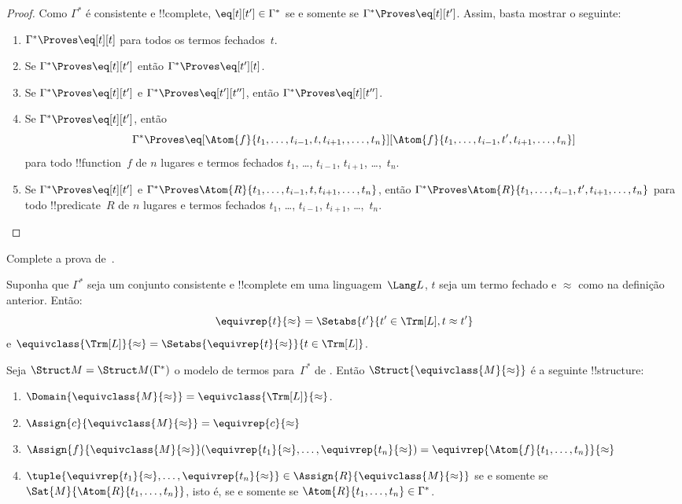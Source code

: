 \documentclass[../../../include/open-logic-section]{subfiles}
\begin{document}
\begin{proof}
Como $\Gamma^*$ é consistente e !!{complete}, $\eq[t][t'] \in
\Gamma^*$ se e somente se $\Gamma^* \Proves \eq[t][t']$.  Assim, basta
mostrar o seguinte:
\begin{enumerate}
\item $\Gamma^* \Proves \eq[t][t]$ para todos os termos fechados~$t$.
\item Se $\Gamma^* \Proves \eq[t][t']$ então $\Gamma^* \Proves \eq[t'][t]$.
\item Se $\Gamma^* \Proves \eq[t][t']$ e $\Gamma^* \Proves
  \eq[t'][t'']$, então $\Gamma^* \Proves \eq[t][t'']$.
\item Se $\Gamma^* \Proves \eq[t][t']$, então
\[
\Gamma^* \Proves
\eq[\Atom{f}{t_1,\dots,t_{i-1},t,t_{i+1},,\dots,t_n}][\Atom{f}{t_1,\dots,t_{i-1},t',t_{i+1},\dots,t_n}]
\]
para todo !!{function}~$f$ de $n$ lugares e termos fechados $t_1$, \dots,
$t_{i-1}$, $t_{i+1}$, \dots,~$t_n$.
\item Se $\Gamma^* \Proves \eq[t][t']$ e
$\Gamma^* \Proves
\Atom{R}{t_1,\dots,t_{i-1},t,t_{i+1},\dots,t_n}$, então
$\Gamma^* \Proves \Atom{R}{t_1,\dots,t_{i-1},t',t_{i+1},\dots,t_n}$
para todo !!{predicate}~$R$ de $n$ lugares e termos fechados $t_1$, \dots,
$t_{i-1}$, $t_{i+1}$, \dots,~$t_n$.
\end{enumerate}
\end{proof}

\begin{prob}
Complete a prova de~.
\end{prob}

\begin{defn}
Suponha que $\Gamma^*$ seja um conjunto consistente e !!{complete} em uma
linguagem~$\Lang L$, $t$ seja um termo fechado e $\approx$ como na
definição anterior. Então:
\[
\equivrep{t}{\approx} = \Setabs{t'}{t'\in \Trm[L], t \approx t'}
\]
e $\equivclass{\Trm[L]}{\approx} = \Setabs{\equivrep{t}{\approx}}{t \in \Trm[L]}$.
\end{defn}

\begin{defn}
Seja $\Struct M = \Struct M(\Gamma^*)$ o modelo de termos
para~$\Gamma^*$ de .  Então $\Struct{\equivclass{M}{\approx}}$ é a seguinte
!!{structure}:
\begin{enumerate}
\item $\Domain{\equivclass{M}{\approx}} = \equivclass{\Trm[L]}{\approx}$.
\item $\Assign{c}{\equivclass{M}{\approx}} = \equivrep{c}{\approx}$
\item $\Assign{f}{\equivclass{M}{\approx}}(\equivrep{t_1}{\approx}, \dots,
  \equivrep{t_n}{\approx}) = \equivrep{\Atom{f}{t_1,\dots, t_n}}{\approx}$
\item $\tuple{\equivrep{t_1}{\approx}, \dots, \equivrep{t_n}{\approx}} \in
  \Assign{R}{\equivclass{M}{\approx}}$ se e somente se
  $\Sat{M}{\Atom{R}{t_1,\dots, t_n}}$, isto é, se e somente se $\Atom{R}{t_1,\dots,
  t_n} \in \Gamma^*$.
\end{enumerate}
\end{defn}
\end{document}

